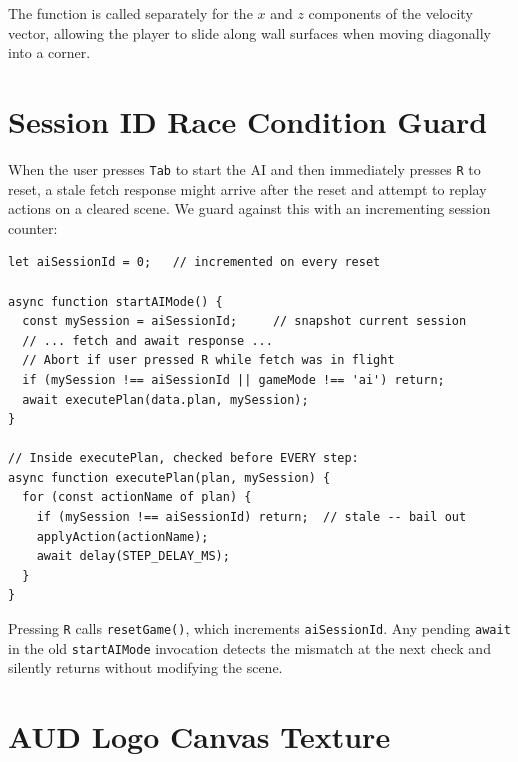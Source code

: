 \documentclass[12pt, a4paper]{report}
\begin{document}
The function is called separately for the $x$ and $z$ components of the
velocity vector, allowing the player to slide along wall surfaces when moving
diagonally into a corner.

\section{Session ID Race Condition Guard}
\label{sec:sessionguard}

When the user presses \texttt{Tab} to start the AI and then immediately presses
\texttt{R} to reset, a stale fetch response might arrive after the reset and
attempt to replay actions on a cleared scene.  We guard against this with an
incrementing session counter:

\begin{lstlisting}[style=jsStyle,
  caption={Session ID guard (\texttt{static/game.js}).},
  label=lst:session]
let aiSessionId = 0;   // incremented on every reset

async function startAIMode() {
  const mySession = aiSessionId;     // snapshot current session
  // ... fetch and await response ...
  // Abort if user pressed R while fetch was in flight
  if (mySession !== aiSessionId || gameMode !== 'ai') return;
  await executePlan(data.plan, mySession);
}

// Inside executePlan, checked before EVERY step:
async function executePlan(plan, mySession) {
  for (const actionName of plan) {
    if (mySession !== aiSessionId) return;  // stale -- bail out
    applyAction(actionName);
    await delay(STEP_DELAY_MS);
  }
}
\end{lstlisting}

Pressing \texttt{R} calls \texttt{resetGame()}, which increments
\texttt{aiSessionId}.  Any pending \texttt{await} in the old
\texttt{startAIMode} invocation detects the mismatch at the next check and
silently returns without modifying the scene.

\section{AUD Logo Canvas Texture}
\label{sec:audlogo}
\end{document}
